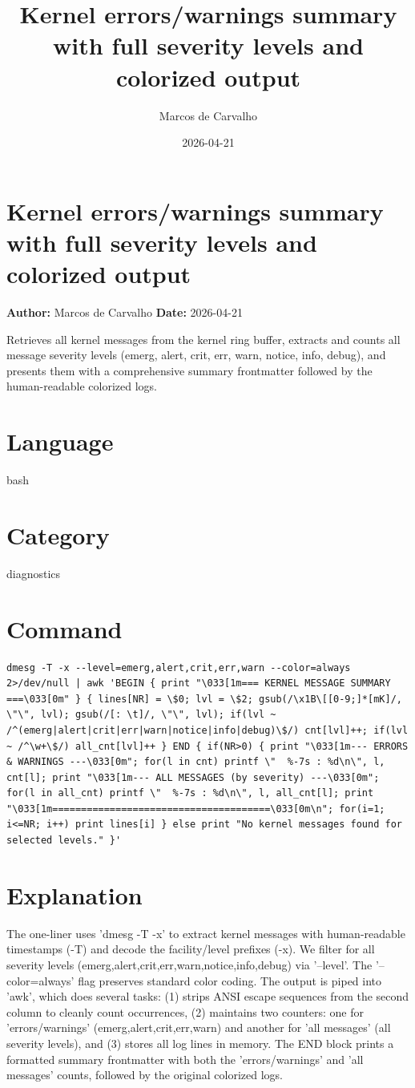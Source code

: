 \documentclass{article}
\title{Kernel errors/warnings summary with full severity levels and colorized output}
\author{Marcos de Carvalho}
\date{2026-04-21}
\begin{document}
\section*{Kernel errors/warnings summary with full severity levels and colorized output}
\textbf{Author:} Marcos de Carvalho \hfill \textbf{Date:} 2026-04-21

\noindent Retrieves all kernel messages from the kernel ring buffer, extracts and counts all message severity levels (emerg, alert, crit, err, warn, notice, info, debug), and presents them with a comprehensive summary frontmatter followed by the human-readable colorized logs.

\section*{Language}
bash

\section*{Category}
diagnostics

\section*{Command}
\begin{lstlisting}
dmesg -T -x --level=emerg,alert,crit,err,warn --color=always 2>/dev/null | awk 'BEGIN { print "\033[1m=== KERNEL MESSAGE SUMMARY ===\033[0m" } { lines[NR] = \$0; lvl = \$2; gsub(/\x1B\[[0-9;]*[mK]/, \"\", lvl); gsub(/[: \t]/, \"\", lvl); if(lvl ~ /^(emerg|alert|crit|err|warn|notice|info|debug)\$/) cnt[lvl]++; if(lvl ~ /^\w+\$/) all_cnt[lvl]++ } END { if(NR>0) { print "\033[1m--- ERRORS & WARNINGS ---\033[0m"; for(l in cnt) printf \"  %-7s : %d\n\", l, cnt[l]; print "\033[1m--- ALL MESSAGES (by severity) ---\033[0m"; for(l in all_cnt) printf \"  %-7s : %d\n\", l, all_cnt[l]; print "\033[1m======================================\033[0m\n"; for(i=1; i<=NR; i++) print lines[i] } else print "No kernel messages found for selected levels." }'
\end{lstlisting}

\section*{Explanation}
The one-liner uses 'dmesg -T -x' to extract kernel messages with human-readable timestamps (-T) and decode the facility/level prefixes (-x). We filter for all severity levels (emerg,alert,crit,err,warn,notice,info,debug) via '--level'. The '--color=always' flag preserves standard color coding. The output is piped into 'awk', which does several tasks: (1) strips ANSI escape sequences from the second column to cleanly count occurrences, (2) maintains two counters: one for 'errors/warnings' (emerg,alert,crit,err,warn) and another for 'all messages' (all severity levels), and (3) stores all log lines in memory. The END block prints a formatted summary frontmatter with both the 'errors/warnings' and 'all messages' counts, followed by the original colorized logs.
\end{document}
